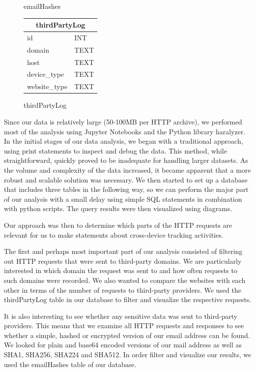 \begin{figure}[ht]
\begin{subtable}[b]{0.3\textwidth}
        \caption{emailHashes}
    \end{subtable}
    \hfill
    \begin{subtable}[b]{0.3\textwidth}
        \centering
        \begin{tabular}{|l|l|}
            \hline
            \multicolumn{2}{|c|}{\textbf{thirdPartyLog}} \\
            \hline
            id           & INT \\
            domain       & TEXT \\
            host         & TEXT \\
            device\_type  & TEXT \\
            website\_type & TEXT \\
            \hline
        \end{tabular}
        \caption{thirdPartyLog}
    \end{subtable}
\end{figure}
Since our data is relatively large (50-100MB per HTTP archive), we performed most of the analysis using Jupyter Notebooks and the Python library haralyzer. In the initial stages of our data analysis, we began with a traditional approach, using print statements to inspect and debug the data. This method, while straightforward, quickly proved to be inadequate for handling larger datasets. As the volume and complexity of the data increased, it became apparent that a more robust and scalable solution was necessary. We then started to set up a database that includes three tables in the following way, so we can perform the major part of our analysis with a small delay using simple SQL statements in combination with python scripts. The query results were then visualized using diagrams.

Our approach was then to determine which parts of the HTTP requests are relevant for us to make statements about cross-device tracking activities.

The first and perhaps most important part of our analysis consisted of filtering out HTTP requests that were sent to third-party domains. We are particularly interested in which domain the request was sent to and how often requests to such domains were recorded. We also wanted to compare the websites with each other in terms of the number of requests to third-party providers. We used the thirdPartyLog table in our database to filter and visualize the respective requests.

It is also interesting to see whether any sensitive data was sent to third-party providers. This means that we examine all HTTP requests and responses to see whether a simple, hashed or encrypted version of our email address can be found. We looked for plain and base64 encoded versions of our mail address as well as SHA1, SHA256, SHA224 and SHA512. In order filter and visualize our results, we used the emailHashes table of our database.

